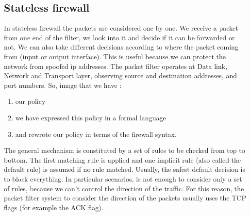 \documentclass[11pt]{article}
\begin{document}
\subsection{Stateless firewall}
In stateless firewall the packets are considered one by one. We receive a packet from one end of the filter, we look into it and decide if it can be forwarded or not. We can also take different decisions according to where the packet coming from (input or output interface). This is useful because we can protect the network from spoofed ip addresses. The packet filter operates at Data link, Network and Transport layer, observing source and destination addresses, and port numbers. So, image that we have :
\begin{enumerate}
\item our policy
\item we have expressed this policy in a formal language
\item and rewrote our policy in terms of the firewall syntax.
\end{enumerate}
The general mechanism is constituted by a set of rules to be checked from top to bottom. The first matching rule is applied and one implicit rule (also called the default rule) is assumed if no rule matched. Usually, the safest default decision is to block everything. In particular scenarios, is not enough to consider only a set of rules, because we can't control the direction of the traffic. For this reason, the packet filter system to consider the direction of the packets usually uses the TCP flags (for example the ACK flag).
\end{document}
